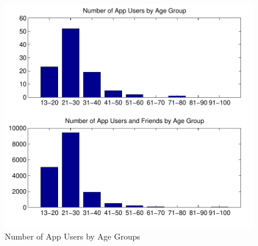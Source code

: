 \begin{figure}[t!]
\centering
\includegraphics[scale=0.6]{data/age_groups_all.pdf}
\vspace{-30pt}
\caption{\small Number of App Users by Age Groups}
\label{fig:agegroups}
\end{figure}

